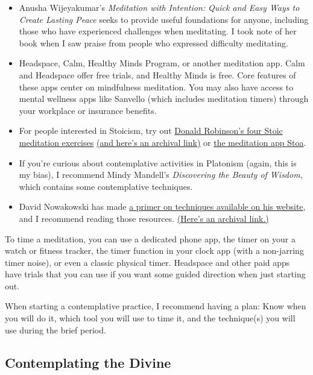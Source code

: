 \documentclass[
]{book}
\providecommand{\tightlist}{%
  \setlength{\itemsep}{0pt}\setlength{\parskip}{0pt}}
\begin{document}
\begin{itemize}
\tightlist
\item
  Anusha Wijeyakumar's \emph{Meditation with Intention: Quick and Easy Ways to Create Lasting Peace} seeks to provide useful foundations for anyone, including those who have experienced challenges when meditating. I took note of her book when I saw praise from people who expressed difficulty meditating.
\item
  Headspace, Calm, Healthy Minds Program, or another meditation app. Calm and Headspace offer free trials, and Healthy Minds is free. Core features of these apps center on mindfulness meditation. You may also have access to mental wellness apps like Sanvello (which includes meditation timers) through your workplace or insurance benefits.
\item
  For people interested in Stoicism, try out \href{https://donaldrobertson.name/2018/03/27/four-stoic-meditation-exercises/}{Donald Robinson's four Stoic meditation exercises} \href{https://web.archive.org/web/2021*/https://donaldrobertson.name/2018/03/27/four-stoic-meditation-exercises/}{(and here's an archival link)} or \href{https://stoameditation.com/}{the meditation app Stoa}.
\item
  If you're curious about contemplative activities in Platonism (again, this is my bias), I recommend Mindy Mandell's \emph{Discovering the Beauty of Wisdom}, which contains some contemplative techniques.
\item
  David Nowakowski has made \href{https://davidnowakowski.net/meditation/}{a primer on techniques available on his website}, and I recommend reading those resources. \href{https://web.archive.org/web/2021*/https://davidnowakowski.net/meditation/}{(Here's an archival link.)}
\end{itemize}

To time a meditation, you can use a dedicated phone app, the timer on your a watch or fitness tracker, the timer function in your clock app (with a non-jarring timer noise), or even a classic physical timer. Headspace and other paid apps have trials that you can use if you want some guided direction when just starting out.

When starting a contemplative practice, I recommend having a plan: Know when you will do it, which tool you will use to time it, and the technique(s) you will use during the brief period.

\hypertarget{contemplating-the-divine}{%
\subsection{Contemplating the Divine}\label{contemplating-the-divine}}
\end{document}
